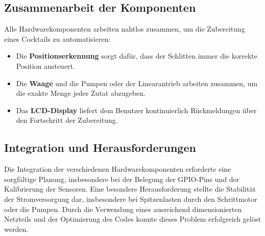 \subsection{Zusammenarbeit der Komponenten}
Alle Hardwarekomponenten arbeiten nahtlos zusammen, um die Zubereitung eines Cocktails zu automatisieren:
\begin{itemize}
    \item Die \textbf{Positionserkennung} sorgt dafür, dass der Schlitten immer die korrekte Position ansteuert.
    \item Die \textbf{Waage} und die Pumpen oder der Linearantrieb arbeiten zusammen, um die exakte Menge jeder Zutat abzugeben.
    \item Das \textbf{LCD-Display} liefert dem Benutzer kontinuierlich Rückmeldungen über den Fortschritt der Zubereitung.
\end{itemize}

\subsection{Integration und Herausforderungen}
Die Integration der verschiedenen Hardwarekomponenten erforderte eine sorgfältige Planung, insbesondere bei der Belegung der GPIO-Pins und der Kalibrierung der Sensoren. Eine besondere Herausforderung stellte die Stabilität der Stromversorgung dar, insbesondere bei Spitzenlasten durch den Schrittmotor oder die Pumpen. Durch die Verwendung eines ausreichend dimensionierten Netzteils und der Optimierung des Codes konnte dieses Problem erfolgreich gelöst werden.
